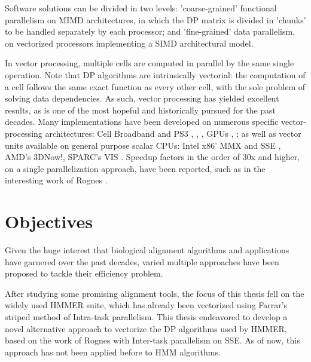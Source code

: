 \documentclass[defaultstyle,10pt,master,Helvetica]{thesis}
\begin{document}
Software solutions can be divided in two levels: 'coarse-grained' functional parallelism on MIMD architectures, in which the \ac{DP} matrix is divided in 'chunks' to be handled separately by each processor; and 'fine-grained' data parallelism, on vectorized processors implementing a SIMD architectural model.

In vector processing, multiple cells are computed in parallel by the same single operation. Note that \ac{DP} algorithms are intrinsically vectorial: the computation of a cell follows the same exact function as every other cell, with the sole problem of solving data dependencies. As such, vector processing has yielded excellent results, as is one of the most hopeful and historically pursued for the past decades. Many implementations have been developed on numerous specific vector-processing architectures: Cell Broadband and PS3 \cite{swps3}, \cite{rudnicki2009cell}, \cite{farrarcell}, GPUs \cite{cudasw}, \cite{cudablast}; as well as vector units available on general purpose scalar CPUs: Intel x86' MMX and SSE \cite{rognes2000} \cite{farrar}, AMD's 3DNow!, SPARC's VIS \cite{wozniak}. Speedup factors in the order of 30x and higher, on a single parallelization approach, have been reported, such as in the interesting work of Rognes \cite{rognes2011}.




\section{Objectives}


Given the huge interest that biological alignment algorithms and applications have garnered over the past decades, varied multiple approaches have been proposed to tackle their efficiency problem. 

After studying some promising alignment tools, the focus of this thesis fell on the widely used HMMER suite, which has already been vectorized using Farrar's striped method \cite{farrar} of Intra-task parallelism. This thesis endeavored to develop a novel alternative approach to vectorize the \ac{DP} algorithms used by HMMER, based on the work of Rognes \cite{rognes2011} with Inter-task parallelism on SSE. As of now, this approach has not been applied before to HMM algorithms.
\end{document}
